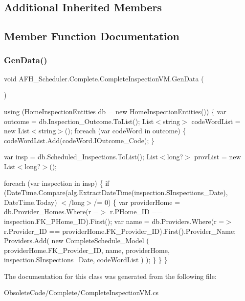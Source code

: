 \subsection*{Additional Inherited Members}


\subsection{Member Function Documentation}
\mbox{\label{class_a_f_h___scheduler_1_1_complete_1_1_complete_inspection_v_m_aff0a19975352ecba2895c0d5f8a03fa5}} 
\subsubsection{GenData()}
{\footnotesize\ttfamily void A\+F\+H\+\_\+\+Scheduler.\+Complete.\+Complete\+Inspection\+V\+M.\+Gen\+Data (\begin{DoxyParamCaption}{ }\end{DoxyParamCaption})}

using (Home\+Inspection\+Entities db = new Home\+Inspection\+Entities()) \{ var outcome = db.\+Inspection\+\_\+\+Outcome.\+To\+List(); List$<$string$>$ code\+Word\+List = new List$<$string$>$(); foreach (var code\+Word in outcome) \{ code\+Word\+List.\+Add(code\+Word.\+I\+Outcome\+\_\+\+Code); \}

var insp = db.\+Scheduled\+\_\+\+Inspections.\+To\+List(); List$<$long?$>$ prov\+List = new List$<$long?$>$();

foreach (var inspection in insp) \{ if (Date\+Time.\+Compare(alg.\+Extract\+Date\+Time(inspection.\+S\+Inspections\+\_\+\+Date), Date\+Time.\+Today) $<$/long$>$/= 0) \{ var provider\+Home = db.\+Provider\+\_\+\+Homes.\+Where(r =$>$ r.\+P\+Home\+\_\+\+ID == inspection.\+F\+K\+\_\+\+P\+Home\+\_\+\+ID).First(); var name = db.\+Providers.\+Where(r =$>$ r.\+Provider\+\_\+\+ID == provider\+Home.\+F\+K\+\_\+\+Provider\+\_\+\+ID).First().Provider\+\_\+\+Name; Providers.\+Add( new Complete\+Schedule\+\_\+\+Model ( provider\+Home.\+F\+K\+\_\+\+Provider\+\_\+\+ID, name, provider\+Home, inspection.\+S\+Inspections\+\_\+\+Date, code\+Word\+List ) ); \} \} \}

The documentation for this class was generated from the following file\+:\begin{DoxyCompactItemize}
\item 
Obsolete\+Code/\+Complete/Complete\+Inspection\+V\+M.\+cs\end{DoxyCompactItemize}

